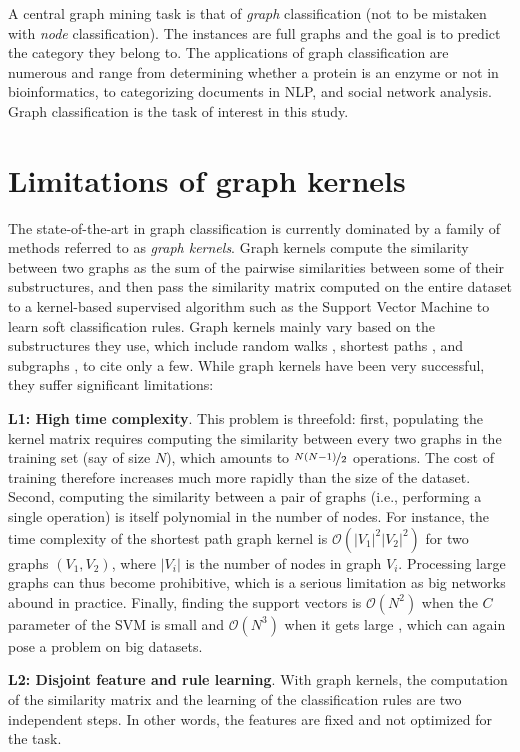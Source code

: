 \documentclass[sigconf]{acmart}
\begin{document}
A central graph mining task is that of \textit{graph} classification (not to be mistaken with \textit{node} classification). The instances are full graphs and the goal is to predict the category they belong to. The applications of graph classification are numerous and range from determining whether a protein is an enzyme or not in bioinformatics, to categorizing documents in NLP, and social network analysis. Graph classification is the task of interest in this study.

\section{Limitations of graph kernels}
The state-of-the-art in graph classification is currently dominated by a family of methods referred to as \textit{graph kernels}. Graph kernels compute the similarity between two graphs as the sum of the pairwise similarities between some of their substructures, and then pass the similarity matrix computed on the entire dataset to a kernel-based supervised algorithm such as the Support Vector Machine \citep{cortes1995support} to learn soft classification rules. Graph kernels mainly vary based on the substructures they use, which include random walks \citep{gartner2003graph}, shortest paths \citep{borgwardt2005shortest}, and subgraphs \citep{shervashidze2009efficient}, to cite only a few. While graph kernels have been very successful, they suffer significant limitations:

\textbf{L1: High time complexity}. This problem is threefold: first, populating the kernel matrix requires computing the similarity between every two graphs in the training set (say of size $N$), which amounts to $\nicefrac{N(N-1)}{2}$ operations. The cost of training therefore increases much more rapidly than the size of the dataset. Second, computing the similarity between a pair of graphs (i.e., performing a single operation) is itself polynomial in the number of nodes. For instance, the time complexity of the shortest path graph kernel is $\mathcal{O} (|V_{1}|^2|V_{2}|^2)$ for two graphs $(V_{1},V_{2})$, where $|V_{i}|$ is the number of nodes in graph $V_{i}$. Processing large graphs can thus become prohibitive, which is a serious limitation as big networks abound in practice. Finally, finding the support vectors is $\mathcal{O}(N^2)$ when the $C$ parameter of the SVM is small and $\mathcal{O}(N^3)$ when it gets large \citep{bottou2007support}, which can again pose a problem on big datasets.

\textbf{L2: Disjoint feature and rule learning}. With graph kernels, the computation of the similarity matrix and the learning of the classification rules are two independent steps. In other words, the features are fixed and not optimized for the task.
\end{document}
